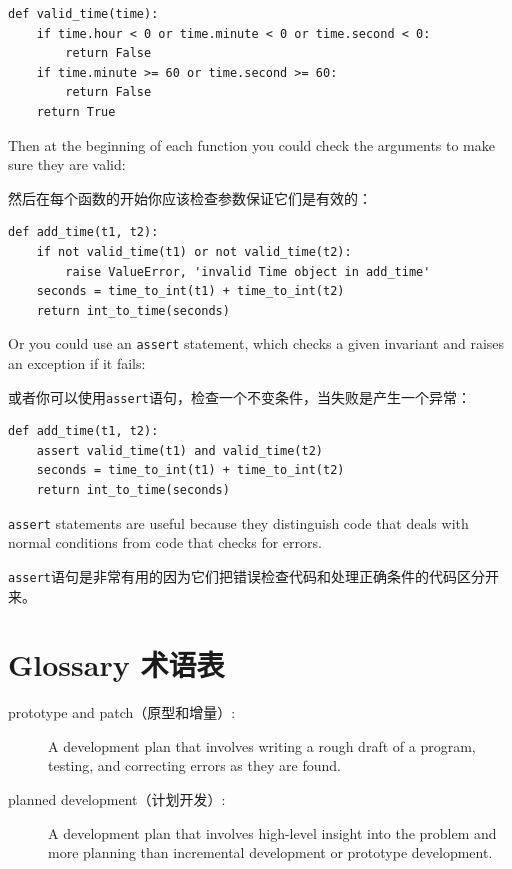 \documentclass[10pt]{book}
\begin{document}
\begin{CJK}{UTF8}{gbsn}
\begin{verbatim}
def valid_time(time):
    if time.hour < 0 or time.minute < 0 or time.second < 0:
        return False
    if time.minute >= 60 or time.second >= 60:
        return False
    return True
\end{verbatim}
%
Then at the beginning of each function you could check the
arguments to make sure they are valid:

然后在每个函数的开始你应该检查参数保证它们是有效的：

\begin{verbatim}
def add_time(t1, t2):
    if not valid_time(t1) or not valid_time(t2):
        raise ValueError, 'invalid Time object in add_time'
    seconds = time_to_int(t1) + time_to_int(t2)
    return int_to_time(seconds)
\end{verbatim}
%
Or you could use an {\tt assert} statement, which checks a given invariant
and raises an exception if it fails:

或者你可以使用{\tt assert}语句，检查一个不变条件，当失败是产生一个异常：

\begin{verbatim}
def add_time(t1, t2):
    assert valid_time(t1) and valid_time(t2)
    seconds = time_to_int(t1) + time_to_int(t2)
    return int_to_time(seconds)
\end{verbatim}
%
{\tt assert} statements are useful because they distinguish
code that deals with normal conditions from code
that checks for errors.

{\tt assert}语句是非常有用的因为它们把错误检查代码和处理正确条件的代码区分开来。


\section{Glossary 术语表}

\begin{description}

\item[prototype and patch（原型和增量）:] A development plan that involves
writing a rough draft of a program, testing, and correcting errors as
they are found.

\item[planned development（计划开发）:] A development plan that involves
high-level insight into the problem and more planning than incremental
development or prototype development.


\end{description}
\end{CJK}
\end{document}
